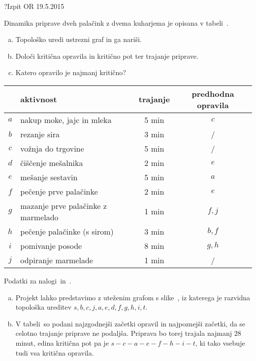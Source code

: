 \begin{naloga}{?}{Izpit OR 19.5.2015}
\begin{vprasanje}
Dinamika priprave dveh palačink z dvema kuharjema
je opisana v tabeli~\tab.
\begin{enumerate}[(a)]
\item Topološko uredi ustrezni graf in ga nariši.
\item Določi kritična opravila in kritično pot ter trajanje priprave.
\item Katero opravilo je najmanj kritično?
\end{enumerate}

\begin{tabela}
\begin{tabular}{c|l|c|c}
& aktivnost & trajanje & predhodna opravila \\
\hline
$a$ & nakup moke, jajc in mleka & 5 min & $c$ \\
$b$ & rezanje sira & 3 min & / \\
$c$ & vožnja do trgovine & 5 min & / \\
$d$ & čiščenje mešalnika & 2 min & $e$ \\
$e$ & mešanje sestavin & 5 min & $a$ \\
$f$ & pečenje prve palačinke & 2 min & $e$ \\
$g$ & mazanje prve palačinke z marmelado & 1 min & $f, j$ \\
$h$ & pečenje palačinke (s sirom) & 3 min & $b, f$ \\
$i$ & pomivanje posode & 8 min & $g, h$ \\
$j$ & odpiranje marmelade & 1 min & / \\
\end{tabular}
\caption{Podatki za nalogi~\nal in~\nal[palacinke2].}
\end{tabela}
\end{vprasanje}

\begin{odgovor}
\begin{enumerate}[(a)]
\item Projekt lahko predstavimo z uteženim grafom s slike~\fig,
iz katerega je razvidna topološka ureditev
$s, b, c, j, a, e, d, f, g, h, i, t$.

\item V tabeli~
so podani najzgodnejši začetki opravil in najpoznejši začetki,
da se celotno trajanje priprave ne podaljša.
Priprava bo torej trajala najmanj $28$ minut,
edina kritična pot pa je $s - c - a - e - f - h - i - t$,
ki tako vsebuje tudi vsa kritična opravila.


\end{enumerate}
\end{odgovor}
\end{naloga}
